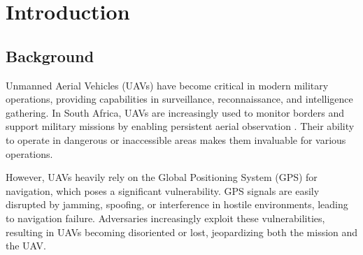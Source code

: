 \graphicspath{{introduction/fig/}}

\chapter{Introduction}
\label{chap:introduction}







\section{Background}
Unmanned Aerial Vehicles (UAVs) have become critical in modern military operations, providing capabilities in surveillance, reconnaissance, and intelligence gathering. In South Africa, UAVs are increasingly used to monitor borders and support military missions by enabling persistent aerial observation \cite{MARTIN}. Their ability to operate in dangerous or inaccessible areas makes them invaluable for various operations.

However, UAVs heavily rely on the Global Positioning System (GPS) for navigation, which poses a significant vulnerability. GPS signals are easily disrupted by jamming, spoofing, or interference in hostile environments, leading to navigation failure. Adversaries increasingly exploit these vulnerabilities, resulting in UAVs becoming disoriented or lost, jeopardizing both the mission and the UAV. 

